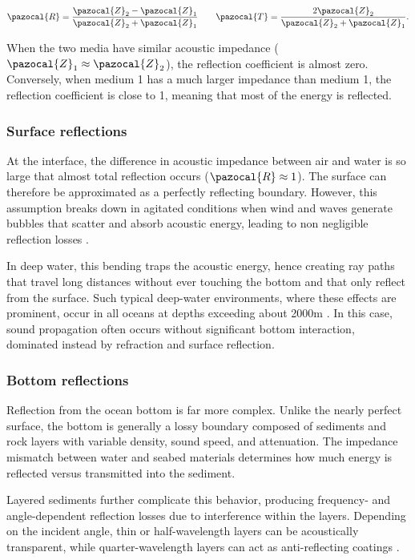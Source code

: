 \documentclass[fleqn]{jaes}
\begin{document}
\begin{equation}
\pazocal{R} = \frac{\pazocal{Z}_2 - \pazocal{Z}_1}{\pazocal{Z}_2 + \pazocal{Z}_1}
\quad\quad
\pazocal{T} = \frac{2\pazocal{Z}_2}{\pazocal{Z}_2 + \pazocal{Z}_1}.
\end{equation}

When the two media have similar acoustic impedance ($\pazocal{Z}_1 \approx \pazocal{Z}_2$), the reflection coefficient is almost zero. Conversely, when medium 1 has a much larger impedance than medium 1, the reflection coefficient is close to 1, meaning that most of the energy is reflected.

\subsubsection{Surface reflections}
At the interface, the difference in acoustic impedance between air and water is so large that almost total reflection occurs ($\pazocal{R} \approx 1$). The surface can therefore be approximated as a perfectly reflecting boundary. However, this assumption breaks down in agitated conditions when wind and waves generate bubbles that scatter and absorb acoustic energy, leading to non negligible reflection losses \cite{Jensen}. 

In deep water, this bending traps the acoustic energy, hence creating ray paths that travel long distances without ever touching the bottom and that only reflect from the surface. Such typical deep-water environments, where these effects are prominent, occur in all oceans at depths exceeding about 2000m \cite{Jensen}. In this case, sound propagation often occurs without significant bottom interaction, dominated instead by refraction and surface reflection.

\subsubsection{Bottom reflections}

Reflection from the ocean bottom is far more complex. Unlike the nearly perfect surface, the bottom is generally a lossy boundary composed of sediments and rock layers with variable density, sound speed, and attenuation. The impedance mismatch between water and seabed materials determines how much energy is reflected versus transmitted into the sediment.

Layered sediments further complicate this behavior, producing frequency- and angle-dependent reflection losses due to interference within the layers. Depending on the incident angle, thin or half-wavelength layers can be acoustically transparent, while quarter-wavelength layers can act as anti-reflecting coatings \cite{Jensen}.
\end{document}
